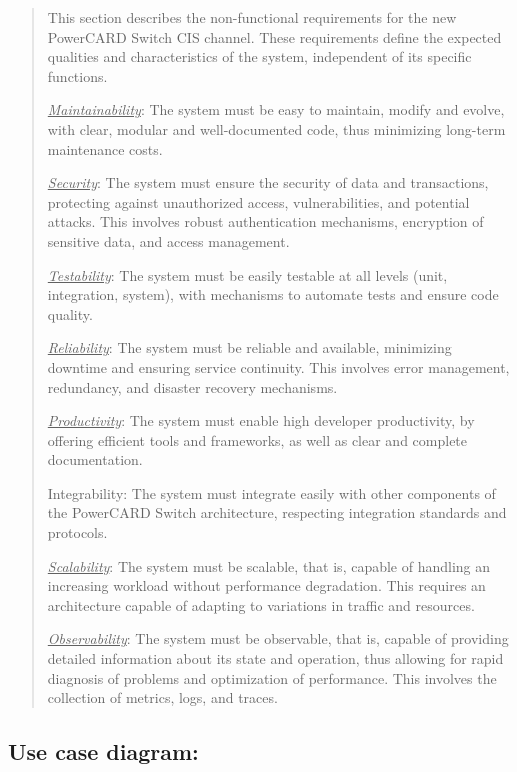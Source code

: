 \documentclass[12pt,a4paper]{report}
\begin{document}
\begin{quote}
This section describes the non-functional requirements for the new
PowerCARD Switch CIS channel. These requirements define the expected
qualities and characteristics of the system, independent of its specific
functions.

\emph{\uline{Maintainability}}: The system must be easy to maintain,
modify and evolve, with clear, modular and well-documented code, thus
minimizing long-term maintenance costs.

\emph{\uline{Security}}: The system must ensure the security of data and
transactions, protecting against unauthorized access, vulnerabilities,
and potential attacks. This involves robust authentication mechanisms,
encryption of sensitive data, and access management.

\emph{\uline{Testability}}: The system must be easily testable at all
levels (unit, integration, system), with mechanisms to automate tests
and ensure code quality.

\emph{\uline{Reliability}}: The system must be reliable and available,
minimizing downtime and ensuring service continuity. This involves error
management, redundancy, and disaster recovery mechanisms.

\emph{\uline{Productivity}}: The system must enable high developer
productivity, by offering efficient tools and frameworks, as well as
clear and complete documentation.

Integrability: The system must integrate easily with other components of
the PowerCARD Switch architecture, respecting integration standards and
protocols.

\emph{\uline{Scalability}}: The system must be scalable, that is,
capable of handling an increasing workload without performance
degradation. This requires an architecture capable of adapting to
variations in traffic and resources.

\emph{\uline{Observability}}: The system must be observable, that is,
capable of providing detailed information about its state and operation,
thus allowing for rapid diagnosis of problems and optimization of
performance. This involves the collection of metrics, logs, and traces.
\end{quote}

\hypertarget{use-case-diagram}{%
\subsection{\texorpdfstring{\textbf{Use case
diagram:}}{Use case diagram:}}\label{use-case-diagram}}
\end{document}
